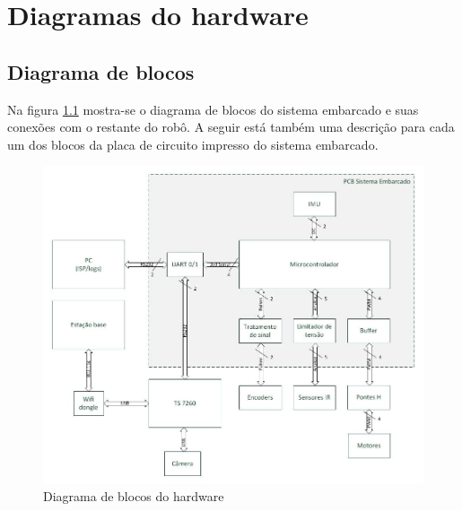 
\chapter{Diagramas do hardware}

\section{Diagrama de blocos}

Na figura \ref{fig:diagrama_blocos_hardware} mostra-se o diagrama de blocos do sistema embarcado e suas conexões com o restante do robô. A seguir está também uma descrição para cada um dos blocos da placa de circuito impresso do sistema embarcado.

\begin{figure}[H]
  \centering
  \includegraphics[width=\textwidth]{./figuras/hardware/diagrama_blocos_hardware.jpg}
  \caption{Diagrama de blocos do hardware}
  \label{fig:diagrama_blocos_hardware}
\end{figure}


